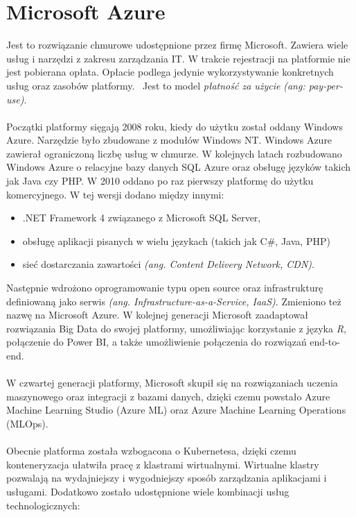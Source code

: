 \chapter{Microsoft Azure}
Jest to rozwiązanie chmurowe udostępnione przez firmę Microsoft. Zawiera wiele usług i narzędzi z zakresu zarządzania IT. W trakcie rejestracji na platformie nie jest pobierana opłata. Opłacie podlega jedynie wykorzystywanie konkretnych usług oraz zasobów platformy. \ Jest to model \textit{płatność za użycie} \textit{(ang: pay-per-use)}.
\\ \\
Początki platformy sięgają 2008 roku, kiedy do użytku został oddany Windows Azure. Narzędzie było zbudowane z modułów Windows NT. Windows Azure zawierał ograniczoną liczbę usług w chmurze. W kolejnych latach rozbudowano Windows Azure o relacyjne bazy danych SQL Azure oraz obsługę języków takich jak Java czy PHP. W 2010 oddano po raz pierwszy platformę do użytku komercyjnego. W tej wersji dodano między innymi:
\begin{itemize}
\item .NET Framework 4 związanego z Microsoft SQL Server,
\item obsługę aplikacji pisanych w wielu językach (takich jak C\#, Java, PHP)
\item sieć dostarczania zawartości \textit{(ang. Content Delivery Network, CDN)}.
\end{itemize}
Następnie wdrożono oprogramowanie typu open source oraz infrastrukturę definiowaną jako serwis \textit{(ang. Infrastructure-as-a-Service, IaaS)}. Zmieniono też nazwę na Microsoft Azure. W kolejnej generacji Microsoft zaadaptował rozwiązania Big Data do swojej platformy, umożliwiając korzystanie z języka \textit{R}, połączenie do Power BI, a także umożliwienie połączenia do rozwiązań end-to-end.
\\ \\
W czwartej generacji platformy, Microsoft skupił się na rozwiązaniach uczenia maszynowego oraz integracji z bazami danych, dzięki czemu powstało Azure Machine Learning Studio (Azure ML) oraz Azure Machine Learning Operations (MLOps).
\\ \\
Obecnie platforma została wzbogacona o Kubernetesa, dzięki czemu konteneryzacja ułatwiła pracę z klastrami wirtualnymi. Wirtualne klastry pozwalają na wydajniejszy i wygodniejszy sposób zarządzania aplikacjami i usługami. Dodatkowo zostało udostępnione wiele kombinacji usług technologicznych:

